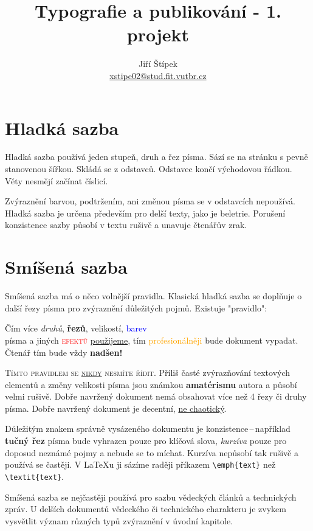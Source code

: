 \documentclass[twocolumn, 10pt]{article}[26.02.2022]
\title{Typografie a publikování - 1. projekt}
\author{Jiří Štípek \\ \href {mailto:xstipe02@stud.fit.vutbr.cz}{xstipe02@stud.fit.vutbr.cz}}
\date{}
\begin{document}
\maketitle
\section{Hladká sazba}
Hladká sazba používá jeden stupeň, druh a řez písma. Sází se na stránku s pevně stanovenou šířkou. Skládá se z odstavců. Odstavec končí východovou řádkou. Věty nesmějí začínat číslicí.

Zvýraznění barvou, podtržením, ani změnou písma se
v odstavcích nepoužívá. Hladká sazba je určena především
pro delší texty, jako je beletrie. Porušení konzistence sazby
působí v textu rušivě a unavuje čtenářův zrak.
\section{Smíšená sazba}
\label{sec:2}
Smíšená sazba má o něco volnější pravidla. Klasická hladká sazba se doplňuje o další řezy písma pro zvýraznění důležitých pojmů. Existuje "pravidlo":
\begin{adjustwidth}{0.8cm}{0.8cm}
    \quad Čím více \textit{druhů}, \textbf{řezů}, {\huge velikostí}, \textcolor{blue}{barev}\\
    písma a jiných \textcolor{red}{\textsc{efektů}} \underline{použijeme}, tím \textcolor{orange}{pro\-fe\-si\-o\-nál\-ně\-ji} bude {\Large {\selectfont dokument}} vypadat. {\tiny Čtenář} tím bude vždy {\Huge \textbf{nadšen!}}
\end{adjustwidth}

\textsc{Tímto pravidlem se \underline{nikdy} nesmíte řídit.} Příliš časté zvýrazňování textových elementů a změny {\tiny velikosti} písma jsou známkou \textbf{amatérismu} autora a působí {\selectfont velmi rušivě}. Dobře navržený dokument nemá obsahovat více než 4 řezy či druhy písma. Dobře navržený dokument je decentní, \underline{ne chaotický}.

Důležitým znakem správně vysázeného dokumentu je konzistence\,--\,například \textbf{tučný řez} písma bude vyhrazen pouze pro klíčová slova, \textit{kurzíva} pouze pro doposud neznámé pojmy a nebude se to míchat.
Kurzíva nepůsobí tak rušivě a používá se častěji.
V \LaTeX u ji sázíme raději příkazem \verb-\emph{text}- než \verb-\textit{text}-.
 
Smíšená sazba se nejčastěji používá pro sazbu vědeckých článků a technických zpráv.
U delších dokumentů vědeckého či technického charakteru je zvykem vysvětlit význam různých typů zvýraznění v úvodní kapitole.
\end{document}
